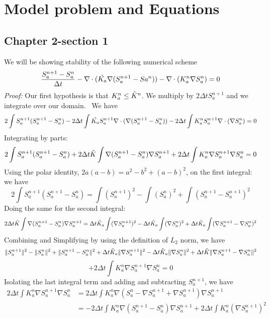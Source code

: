 \chapter{Model problem and Equations}
\label{sec:chapter2}

\minitoc 


	\section{Chapter 2-section 1}
\label{sec:chapter_1_sec_1}


We will be showing stability of the following numerical scheme
\[
\frac{S_{a}^{n+1}- S_{a}^{n}}{\Delta t} - 
\nabla \cdot (\Tilde{K_a}\nabla(S_{a}^{n+1}-Sa^{n})) 
- \nabla \cdot ( K_{a}^{n} \nabla S_{a}^{n}) = 0
\]
\textit{Proof:}
Our first hypothesis is that $K_a^{n} \leq \Tilde{K}^{n}$.
We multiply by  $2\Delta t S_{a}^{n+1}$ and we integrate over our domain. \
We have
\[
2 \int S_{a}^{n+1}(S_{a}^{n+1} - S_{a}^{n}) - 
2 \Delta t \int  \Tilde{K_{a}} S_{a}^{n+1} 
\nabla \cdot(\nabla(S_{a}^{n+1}-S_{a}^{n}))
- 2 \Delta t \int K_a^n S_a^{n+1} \nabla \cdot (\nabla S_a^n)= 0
\]
Integrating by parts:
\[
2 \int S_{a}^{n+1}(S_{a}^{n+1} - S_{a}^{n}) 
+ 2 \Delta t \Tilde{K} \int \nabla(S_{a}^{n+1} 
- S_{a}^{n}) \nabla S_{a}^{n+1} + 2 \Delta t \int K_a^{n} 
\nabla S_a^{n+1} \nabla S_a^{n} = 0         
\]
Using the polar identity, $2a(a-b) = a^2 - b^2 +(a-b)^2$, on the first integral:
we have
\[
2 \int S_a^{n+1} (S_a^{n+1}-S_a^{n}) = 
\int (S_a^{n+1})^2 - \int (S_a^{n})^2 + \int (S_a^{n+1} - S_a^{n+1})^2
\]
Doing the same for the second integral:
\[
2 \Delta t \Tilde{K} \int \nabla(S_{a}^{n+1} 
- S_{a}^{n}) \nabla S_{a}^{n+1} =  \Delta t \Tilde{K}_a \int (\nabla S_a^{n+1})^2 -
\Delta t \Tilde{K}_a \int (\nabla S_a^{n})^2 + \Delta t \Tilde{K}_a 
\int (\nabla S_a^{n+1} - \nabla S_a^{n})^2
\]
Combining and Simplifying by using the definition of  $L_2$ norm, we have
\[
\| S_a^{n+1} \|^2-\| S_a^{n} \|^2 + \| S_a^{n+1} - S_a^{n} \|^2+
\Delta t \Tilde{K}_a \|\nabla S_a^{n+1} \|^2-   \Delta t
\Tilde{K}_a \| \nabla S_a^{n} \|^2 + \Delta t \Tilde{K} \|
\nabla S_a^{n+1} - \nabla S_a^{n} \|^2
\]
\[
+ 2 \Delta t \int K_a^{n} \nabla S_a^{n+1} \nabla S_a^{n} = 0
\]
Isolating the last integral term and adding and subtracting $ S_a^{n+1}$, we
have 
\begin{align*}
	2 \Delta t \int K_a^{n} \nabla S_a^{n+1} \nabla S_a^{n}  &= 2 \Delta t
	\int K_a^{n} \nabla( S_a^n - \nabla S_a^{n+1} +\nabla S_a^{n+1}) \nabla
	S_a^{n+1} \\
	&=  -2 \Delta t \int K_a^n \nabla(S_a^{n+1} - S_a^n)\nabla
	S_a^{n+1} + 2 \Delta t \int K_a^n (\nabla S_a^{n+1})^2
\end{align*}
